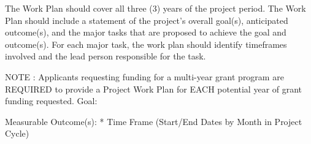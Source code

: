 The Work Plan should cover all three (3) years of the project period. The Work Plan should include a statement of the project's overall goal(s), anticipated outcome(s), and the major tasks that are proposed to achieve the goal and outcome(s). For each major task, the work plan should identify timeframes involved and the lead person responsible for the task.

NOTE : Applicants requesting funding for a multi-year grant program are REQUIRED to provide a Project Work Plan for EACH potential year of grant funding requested.
Goal:

Measurable Outcome(s):
* Time Frame (Start/End Dates by Month in Project Cycle)

\begin{table}[h]
\end{table}